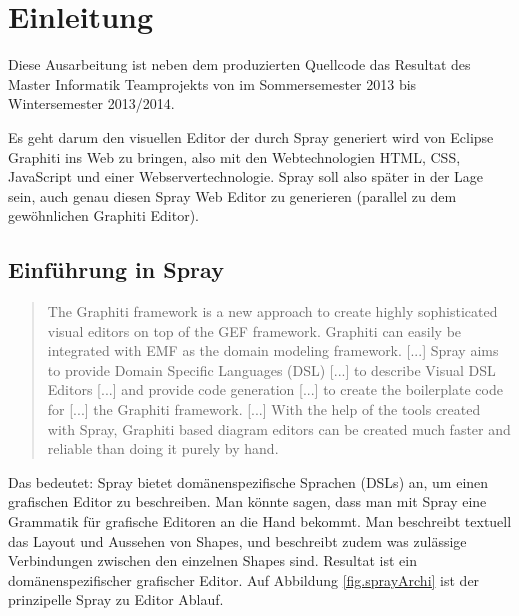 \section{Einleitung}

Diese Ausarbeitung ist neben dem produzierten Quellcode das Resultat des
Master Informatik Teamprojekts von \autor im Sommersemester 2013 bis
Wintersemester 2013/2014.

Es geht darum den visuellen Editor der durch Spray generiert wird
von Eclipse Graphiti ins Web zu bringen, also mit den Webtechnologien
HTML, CSS, JavaScript und einer Webservertechnologie.
Spray soll also später in der Lage sein, auch genau diesen Spray
Web Editor zu generieren (parallel zu dem gewöhnlichen Graphiti Editor).

\subsection{Einführung in Spray}

\begin{quote}
The Graphiti framework is a new approach to create highly sophisticated
visual editors on top of the GEF framework.
Graphiti can easily be integrated with EMF as the
domain modeling framework. [...]
Spray aims to provide Domain Specific Languages (DSL) [...]
to describe Visual DSL Editors [...]
and provide code generation [...] to create the boilerplate code
for [...] the Graphiti framework. [...]
With the help of the tools created with Spray,
Graphiti based diagram editors can be created much faster
and reliable than doing it purely by hand. \citep{sprayWebpage}
\end{quote}

\noindent Das bedeutet: Spray bietet domänenspezifische Sprachen (DSLs) an,
um einen grafischen Editor zu beschreiben. Man könnte sagen, dass
man mit Spray eine Grammatik für grafische Editoren an die Hand bekommt.
Man beschreibt textuell das Layout und Aussehen von Shapes, und beschreibt
zudem was zulässige Verbindungen zwischen den einzelnen Shapes sind.
Resultat ist ein domänenspezifischer grafischer Editor.
Auf Abbildung \ref{fig.sprayArchi} ist der prinzipelle Spray zu Editor Ablauf. 

